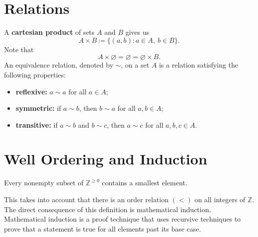 
\section{Relations}

\begin{definition}
    A \textbf{cartesian product} of sets $A$ and $B$ gives us
    \[
        A \times B \coloneqq \{(a,b) : a \in A,\ b \in B\}.
    \]
    Note that
    \[
        A \times \varnothing = \varnothing = \varnothing \times B.
    \]
    An equivalence relation, denoted by $\sim$, on a set $A$ is a relation satisfying the following properties:
    \begin{itemize}
        \item \textbf{reflexive:} $a \sim a$ for all $a \in A$;
        \item \textbf{symmetric:} if $a \sim b$, then $b \sim a$ for all $a,b \in A$;
        \item \textbf{transitive:} if $a \sim b$ and $b \sim c$, then $a \sim c$ for all $a,b,c \in A$.
    \end{itemize}
\end{definition}

\section{Well Ordering and Induction}

\begin{definition}
    Every nonempty subset of $\mathbb{Z}^{\geq 0}$ contains a smallest element.
\end{definition}

This takes into account that there is an order relation $(<)$ on all integers of $\mathbb{Z}$.
The direct consequence of this definition is mathematical induction.
Mathematical induction is a proof technique that uses recursive techniques to prove that a statement is true for all elements past its base case.

